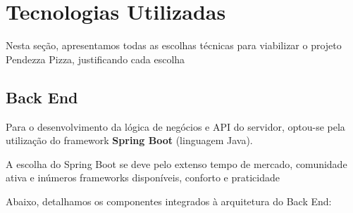 \documentclass[12pt, a4paper]{article}
\begin{document}
\section{Tecnologias Utilizadas}
Nesta seção, apresentamos todas as escolhas técnicas para viabilizar o projeto Pendezza Pizza, justificando cada escolha

\subsection{Back End}
Para o desenvolvimento da lógica de negócios e API do servidor, optou-se pela utilização do framework \textbf{Spring Boot} (linguagem Java).

A escolha do Spring Boot se deve pelo extenso tempo de mercado, comunidade ativa e inúmeros frameworks disponíveis, conforto e praticidade

Abaixo, detalhamos os componentes integrados à arquitetura do Back End:
\end{document}
